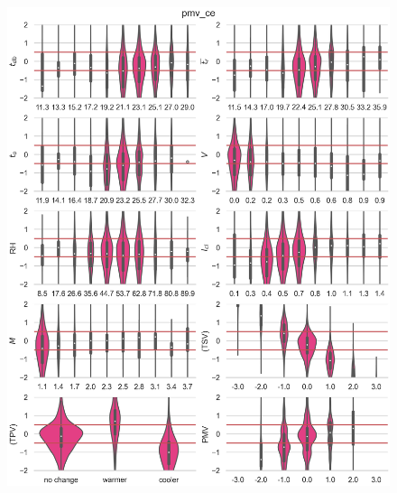 \begin{figure}
    \centering
    \includegraphics[width=\textwidth]{figures/bias_pmv_ce}
    \caption{}
    \label{fig:bias_pmv_ce}
\end{figure}

